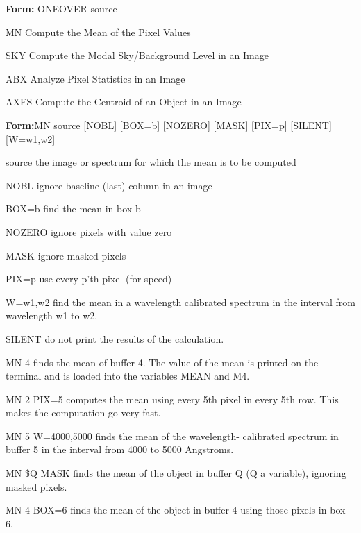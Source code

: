 {\newpage\clearpage
{}%
\begin{command}
  \item[\textbf{Form:} ONEOVER source\hfill]{}
\end{command}%
\lthtmlfigureZ
\lthtmlcheckvsize\clearpage}

{\newpage\clearpage
{}%
\begin{example}
  \item[MN\hfill]{Compute the Mean of the Pixel Values}
  \item[SKY\hfill]{Compute the Modal Sky/Background Level in an Image}
  \item[ABX\hfill]{Analyze Pixel Statistics in an Image}
  \item[AXES\hfill]{Compute the Centroid of an Object in an Image}
\end{example}%
\lthtmlfigureZ
\lthtmlcheckvsize\clearpage}

{\newpage\clearpage
{}%
\begin{command}
  \item[\textbf{Form:}MN source {[NOBL]} {[BOX=b]} {[NOZERO]} {[MASK]}
       {[PIX=p]} {[SILENT]} {[W=w1,w2]}\hfill]{}
  \item[source]{the image or spectrum for which the mean
       is to be computed}
  \item[NOBL]{ignore baseline (last) column in an image}
  \item[BOX=b]{find the mean in box b}
  \item[NOZERO]{ignore pixels with value zero}
  \item[MASK]{ignore masked pixels}
  \item[PIX=p]{use every p'th pixel (for speed)}
  \item[W=w1,w2]{find the mean in a wavelength calibrated
       spectrum in the interval from wavelength w1 to w2.}
  \item[SILENT]{do not print the results of the calculation.}
\end{command}%
\lthtmlfigureZ
\lthtmlcheckvsize\clearpage}

{\newpage\clearpage
{}%
\begin{example}
  \item[MN 4\hfill]{finds the mean of buffer 4.  The
  value of the mean is printed on the terminal and is loaded into the 
  variables MEAN and M4.}
  \item[MN 2 PIX=5\hfill]{computes the mean using every 5th 
  pixel in every 5th row.  This makes the computation go very fast.}
  \item[MN 5 W=4000,5000\hfill]{finds the mean of the wavelength-
  calibrated spectrum in buffer 5 in the interval from 4000 to 5000 Angstroms.}
  \item[MN \$Q MASK\hfill]{finds the mean of the object in buffer
  Q (Q a variable), ignoring masked pixels.}
  \item[MN 4 BOX=6\hfill]{finds the mean of the object in
  buffer 4 using those pixels in box 6.}
\end{example}%
\lthtmlfigureZ
\lthtmlcheckvsize\clearpage}


